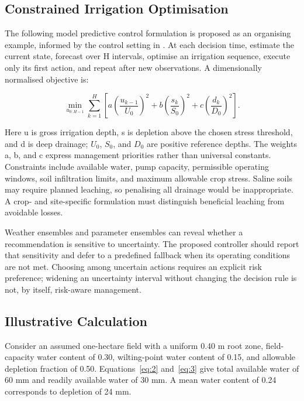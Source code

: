 \documentclass[11pt,a4paper]{article}
\begin{document}
\subsection{Constrained Irrigation Optimisation}

\label{sec:8-1}

The following model predictive control formulation is proposed as an organising example, informed by the control setting in \cite{R18}. At each decision time, estimate the current state, forecast over H intervals, optimise an irrigation sequence, execute only its first action, and repeat after new observations. A dimensionally normalised objective is:

\begin{equation}
\min_{u_{0:H-1}}\sum_{k=1}^{H}\left[a\left(\frac{u_{k-1}}{U_0}\right)^2+b\left(\frac{s_k}{S_0}\right)^2+c\left(\frac{d_k}{D_0}\right)^2\right].
\label{eq:11}
\end{equation}

Here u is gross irrigation depth, s is depletion above the chosen stress threshold, and d is deep drainage; $U_{0}$, $S_{0}$, and $D_{0}$ are positive reference depths. The weights a, b, and c express management priorities rather than universal constants. Constraints include available water, pump capacity, permissible operating windows, soil infiltration limits, and maximum allowable crop stress. Saline soils may require planned leaching, so penalising all drainage would be inappropriate. A crop- and site-specific formulation must distinguish beneficial leaching from avoidable losses.

Weather ensembles and parameter ensembles can reveal whether a recommendation is sensitive to uncertainty. The proposed controller should report that sensitivity and defer to a predefined fallback when its operating conditions are not met. Choosing among uncertain actions requires an explicit risk preference; widening an uncertainty interval without changing the decision rule is not, by itself, risk-aware management.

\subsection{Illustrative Calculation}

\label{sec:8-2}

Consider an assumed one-hectare field with a uniform 0.40 m root zone, field-capacity water content of 0.30, wilting-point water content of 0.15, and allowable depletion fraction of 0.50. Equations~\eqref{eq:2} and~\eqref{eq:3} give total available water of 60 mm and readily available water of 30 mm. A mean water content of 0.24 corresponds to depletion of 24 mm.
\end{document}

